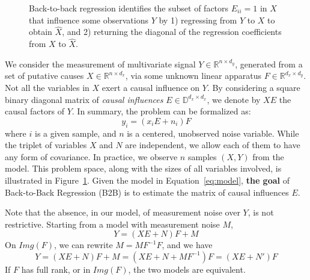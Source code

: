 \documentclass{article}
\begin{document}
\begin{figure}[t!]
    \caption{Back-to-back regression identifies the subset of factors $E_{ii} = 1$ in $X$ that influence some observations $Y$ by 1) regressing from $Y$ to $X$ to obtain $\hat{X}$, and 2) returning the diagonal of the regression coefficients from $X$ to $\hat{X}$.}
    \label{fig:b2b}
\end{figure}

We consider the measurement of multivariate signal $Y \in \mathbb{R}^{n \times d_y}$, generated from a set of putative causes $X \in \mathbb{R}^{n \times d_x}$, via some unknown linear apparatus $F \in \mathbb{R}^{d_x \times d_y}$.
%
Not all the variables in $X$ exert a causal influence on $Y$.
%
By considering a square binary diagonal matrix of \emph{causal influences} $E \in \mathbb{D}^{d_x \times d_x}$, we denote by $XE$ the causal factors of $Y$.
%
In summary, the problem can be formalized as:
%
\begin{equation}
    y_i = (x_i E + n_i) F
    \label{eq:model}
\end{equation}
%
where $i$ is a given sample, and $n$ is a centered, unobserved noise variable.
%
While the triplet of variables $X$ and $N$ are independent, we allow each of them to have any form of covariance.
%
In practice, we observe $n$ samples $(X, Y)$ from the model.
%
This problem space, along with the sizes of all variables involved, is illustrated in Figure~\ref{fig:b2b}.
%
Given the model in Equation~\eqref{eq:model}, \textbf{the goal} of Back-to-Back Regression (B2B) is to estimate the matrix of causal influences $E$.

Note that the absence, in our model, of measurement noise over $Y$, is not restrictive. Starting from a model with measurement noise $M$, $$Y=(XE+N)F+M$$ On $Img(F)$,
we can rewrite $M = MF^{-1}F$, and we have
$$Y = (XE+N)F+M = (XE+N+MF^{-1})F = (XE+N')F$$
If $F$ has full rank, or in $Img(F)$, the two models are equivalent.
\end{document}
